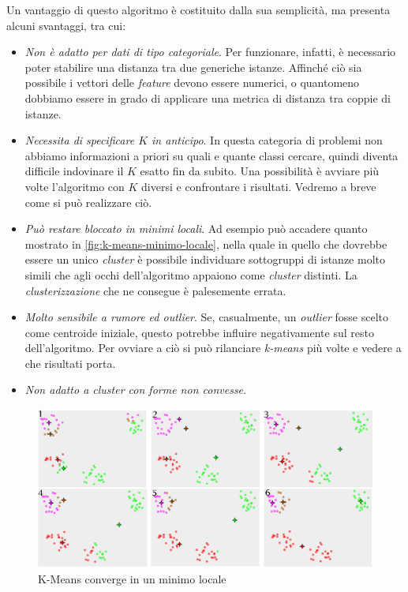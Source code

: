 Un vantaggio di questo algoritmo è costituito dalla sua semplicità, ma presenta alcuni svantaggi, tra cui:
\begin{itemize}
\item\emph{ Non è adatto per dati di tipo categoriale}. Per funzionare, infatti, è necessario poter stabilire una distanza tra due generiche istanze. Affinché ciò sia possibile i vettori delle \emph{feature} devono essere numerici, o quantomeno dobbiamo essere in grado di applicare una metrica di distanza tra coppie di istanze.
\item\emph{Necessita di specificare $K$ in anticipo}. In questa categoria di problemi non abbiamo informazioni a priori su quali e quante classi cercare, quindi diventa difficile indovinare il $K$ esatto fin da subito. Una possibilità è avviare più volte l'algoritmo con $K$ diversi e confrontare i risultati. Vedremo a breve come si può realizzare ciò.
\item\emph{Può restare bloccato in minimi locali}. Ad esempio può accadere quanto mostrato in \autoref{fig:k-means-minimo-locale}, nella quale in quello che dovrebbe essere un unico \emph{cluster} è possibile individuare sottogruppi di istanze molto simili che agli occhi dell'algoritmo appaiono come \emph{cluster} distinti. La \emph{clusterizzazione} che ne consegue è palesemente errata.
\item\emph{Molto sensibile a rumore ed outlier}. Se, casualmente, un \emph{outlier} fosse scelto come centroide iniziale, questo potrebbe influire negativamente sul resto dell'algoritmo. Per ovviare a ciò si può rilanciare \emph{k-means} più volte e vedere a che risultati porta.
\item\emph{Non adatto a cluster con forme non convesse}.
\end{itemize}


\begin{figure}[tbp]
\centering
  \includegraphics[width = \textwidth]{images/k-means-minimo-locale}
  \caption{K-Means converge in un minimo locale}
  \label{fig:k-means-minimo-locale}
\end{figure}

